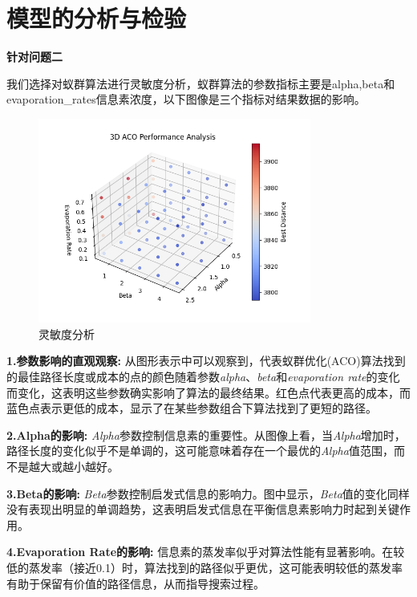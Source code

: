 \documentclass[withoutpreface,bwprint]{thesis-config}
\begin{document}

\clearpage
\section{模型的分析与检验}


\par \textbf{针对问题二}
\par 我们选择对蚁群算法进行灵敏度分析，蚁群算法的参数指标主要是alpha,beta和evaporation\_rates信息素浓度，以下图像是三个指标对结果数据的影响。
\begin{figure}[!htbp]
    \centering
    \includegraphics[width=0.8\textwidth]{figures/senstivity2.png}
    \caption{灵敏度分析}
\end{figure}
\par \textbf{1.参数影响的直观观察:}
从图形表示中可以观察到，代表蚁群优化(ACO)算法找到的最佳路径长度或成本的点的颜色随着参数\textit{alpha}、\textit{beta}和\textit{evaporation rate}的变化而变化，这表明这些参数确实影响了算法的最终结果。红色点代表更高的成本，而蓝色点表示更低的成本，显示了在某些参数组合下算法找到了更短的路径。

\par \textbf{2.Alpha的影响:}
\textit{Alpha}参数控制信息素的重要性。从图像上看，当\textit{Alpha}增加时，路径长度的变化似乎不是单调的，这可能意味着存在一个最优的\textit{Alpha}值范围，而不是越大或越小越好。

\par \textbf{3.Beta的影响:}
\textit{Beta}参数控制启发式信息的影响力。图中显示，\textit{Beta}值的变化同样没有表现出明显的单调趋势，这表明启发式信息在平衡信息素影响力时起到关键作用。

\par \textbf{4.Evaporation Rate的影响:}
信息素的蒸发率似乎对算法性能有显著影响。在较低的蒸发率（接近0.1）时，算法找到的路径似乎更优，这可能表明较低的蒸发率有助于保留有价值的路径信息，从而指导搜索过程。
\end{document}
